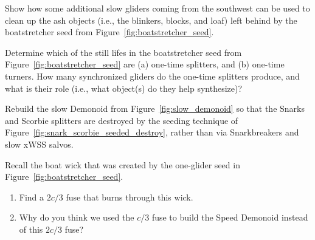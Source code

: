 \begin{multicols}{2}
	
	\mfilbreak
	
	
	\begin{problem}\label{exer:boatstretcher_seed_slow_cleanup} 
		Show how some additional slow gliders coming from the southwest can be used to clean up the ash objects (i.e., the blinkers, blocks, and loaf) left behind by the boatstretcher seed from Figure~\ref{fig:boatstretcher_seed}.
	\end{problem}
	
	
	\mfilbreak
	
	
	\begin{problem}\label{exer:boatstretcher_seed_identify} 
		Determine which of the still lifes in the boatstretcher seed from Figure~\ref{fig:boatstretcher_seed} are (a) one-time splitters, and (b) one-time turners. How many synchronized gliders do the one-time splitters produce, and what is their role (i.e., what object(s) do they help synthesize)?
	\end{problem}
	
	
	\mfilbreak
	
	
	\begin{problem}\label{exer:slow_demonoid_via_seeds_of_destruct} 
		Rebuild the slow Demonoid from Figure~\ref{fig:slow_demonoid} so that the Snarks and Scorbie splitters are destroyed by the seeding technique of Figure~\ref{fig:snark_scorbie_seeded_destroy}, rather than via Snarkbreakers and slow xWSS salvos.
	\end{problem}
	
	
	\mfilbreak
	
	
	\begin{problem}\label{exer:boatstretcher_2c3_fuse} 
		Recall the boat wick that was created by the one-glider seed in Figure~\ref{fig:boatstretcher_seed}.\smallskip
		
		\begin{enumerate}[label=\bf\color{ocre}(\alph*)]
			\item Find a $2c/3$ fuse that burns through this wick.
			
			
			\item Why do you think we used the $c/3$ fuse to build the Speed Demonoid instead of this $2c/3$ fuse?
		\end{enumerate}
	\end{problem}
	

\end{multicols}
